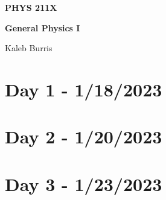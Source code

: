 \documentclass[12pt, letterpaper]{book}
\begin{document}
    \begin{titlepage}
        \Huge \textbf{PHYS 211X}

        \huge \textbf{General Physics I}

        \vfill

        \Large Kaleb Burris
    \end{titlepage}

    \section*{Day 1 - 1/18/2023}

    

    \section*{Day 2 - 1/20/2023}

    

    \section*{Day 3 - 1/23/2023}

    
\end{document}
